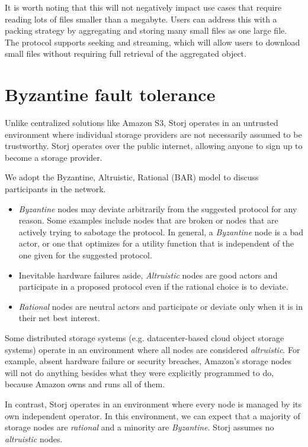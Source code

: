 \documentclass[8pt,fleqn,openany]{book}
\begin{document}
It is worth noting that this will not negatively impact use cases that
require reading lots of files smaller than a megabyte. Users can address this
with a packing strategy by aggregating and storing many small files as one
large file.
The protocol supports seeking and streaming, which will allow users to download small files
without requiring full retrieval of the aggregated object.

\section{Byzantine fault tolerance}

Unlike centralized solutions like Amazon S3, Storj operates in an untrusted
environment where individual storage providers are not necessarily assumed to be
trustworthy. Storj operates over the public internet, allowing anyone to sign
up to become a storage provider.

We adopt the Byzantine, Altruistic, Rational (BAR) model \cite{bar} to discuss
participants in the network.

\begin{itemize}
\item {\em Byzantine} nodes may deviate arbitrarily from the suggested
  protocol for any reason. Some examples include nodes that are broken or nodes
  that are actively trying to sabotage the protocol. In general, a
  {\em Byzantine} node is a bad actor, or one that optimizes for a utility
  function that is independent of the one given for the suggested protocol.
\item Inevitable hardware failures aside, {\em Altruistic} nodes are good
  actors and participate in a proposed protocol even if the rational choice is
  to deviate.
\item {\em Rational} nodes are neutral actors and participate or deviate only
  when it is in their net best interest.
\end{itemize}

Some distributed storage systems (e.g. datacenter-based cloud object storage systems)
operate in an environment
where all nodes are considered {\em altruistic}. For example, absent hardware failure
or security breaches, Amazon's storage nodes
will not do anything besides what they were explicitly programmed to do,
because Amazon owns and runs all of them.

In contrast, Storj operates in an environment where every node is
managed by its own independent operator.
In this environment, we can expect that a majority
of storage nodes are {\em rational} and a minority are {\em Byzantine}. Storj assumes no
{\em altruistic} nodes.
\end{document}
